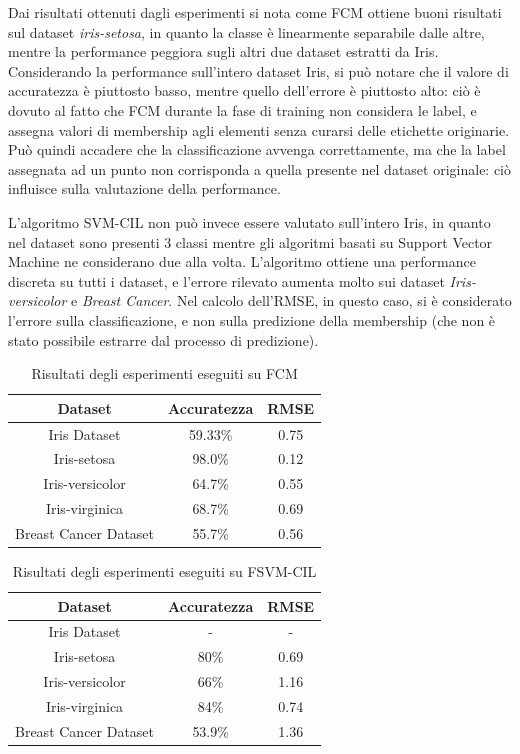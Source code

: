 \documentclass[oneside, openany]{book}
\begin{document}
		Dai risultati ottenuti dagli esperimenti si nota come FCM ottiene buoni risultati sul dataset \textit{iris-setosa}, in quanto la classe è linearmente separabile dalle altre, mentre la performance peggiora sugli altri due dataset estratti da Iris. Considerando la performance sull'intero dataset Iris, si può notare che il valore di accuratezza è piuttosto basso, mentre quello dell'errore è piuttosto alto: ciò è dovuto al fatto che FCM durante la fase di training non considera le label, e assegna valori di membership agli elementi senza curarsi delle etichette originarie. Può quindi accadere che la classificazione avvenga correttamente, ma che la label assegnata ad un punto non corrisponda a quella presente nel dataset originale: ciò influisce sulla valutazione della performance.
		
		L'algoritmo SVM-CIL non può invece essere valutato sull'intero Iris, in quanto nel dataset sono presenti 3 classi mentre gli algoritmi basati su Support Vector Machine ne considerano due alla volta. L'algoritmo ottiene una performance discreta su tutti i dataset, e l'errore rilevato aumenta molto sui dataset \textit{Iris-versicolor} e \textit{Breast Cancer}. Nel calcolo dell'RMSE, in questo caso, si è considerato l'errore sulla classificazione, e non sulla predizione della membership (che non è stato possibile estrarre dal processo di predizione).
		\begin{table}[h]
		\caption{Risultati degli esperimenti eseguiti su FCM}
		\begin{center}\begin{tabular}{ |c|c|c| } 
				\hline
				\textbf{Dataset} & \textbf{Accuratezza} & \textbf{RMSE}\\
				\hline
				Iris Dataset & 59.33\% & 0.75\\
				\hline
				Iris-setosa & 98.0\% & 0.12\\
				\hline
				Iris-versicolor & 64.7\% & 0.55\\
				\hline
				Iris-virginica & 68.7\% & 0.69\\
				\hline
				Breast Cancer Dataset &  55.7\% & 0.56\\
				\hline									
			\end{tabular}
		\end{center}
		\label{tab:fcm}	
		\end{table}
		\begin{table}[h]
			\caption{Risultati degli esperimenti eseguiti su FSVM-CIL}
			\begin{center}\begin{tabular}{ |c|c|c| } 
				\hline
				Dataset & Accuratezza & RMSE\\
				\hline
				Iris Dataset& - & - \\
				\hline
				Iris-setosa & 80\% & 0.69\\
				\hline
				Iris-versicolor & 66\% & 1.16\\
				\hline
				Iris-virginica & 84\% & 0.74\\
				\hline
				Breast Cancer Dataset &  53.9\% & 1.36\\
				\hline									
			\end{tabular}
		\end{center}
		\label{tab:fsvm}	
		\end{table}
\end{document}
